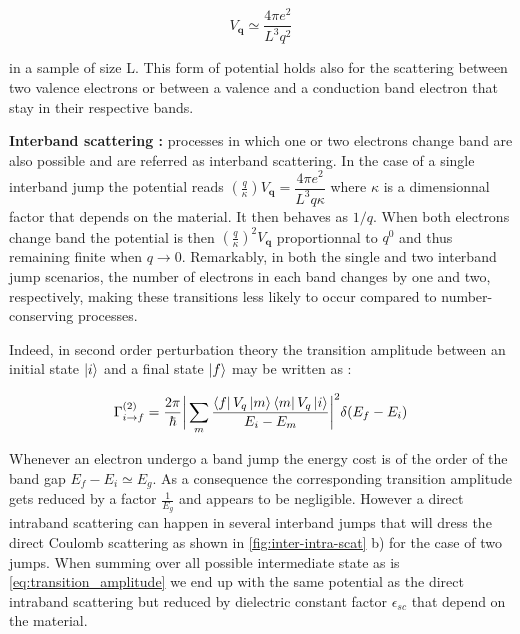 \begin{equation}
    V_{\textbf{q}} \simeq \dfrac{4\pi e^2}{L^3 q^2}
\end{equation}
 
\noindent in a sample of size L. This form of potential holds also for the scattering between two valence electrons or between a valence and a conduction band electron that stay in their respective bands.

\bigskip

\textbf{Interband scattering :}
processes in which one or two electrons change band are also possible and are referred as interband scattering. In the case of a single 
interband jump the potential reads $(\frac{q}{\kappa})V_{\textbf{q}}= \dfrac{4\pi e^2}{L^3 q \kappa}$ where $\kappa$ is a dimensionnal factor that depends on the material. It then behaves as $1/q$. When both electrons change band the potential is then $(\frac{q}{\kappa})^2V_{\textbf{q}}$ proportionnal to $q^0$
and thus remaining finite when $q\to 0$. Remarkably, in both the single and two interband jump scenarios, the number of electrons in each band changes by one and two, respectively, making these transitions less likely to occur compared to number-conserving processes.

\bigskip
Indeed, in second order perturbation theory the transition amplitude between an initial state $\ket{i}$ and a final state $\ket{f}$ may be written as :

\begin{equation}
    \Gamma_{i\to f}^{(2)} = \dfrac{2\pi}{\hbar} \bigg \vert \sum_{m} \dfrac{\bra{f}V_q\ket{m}\bra{m}V_q\ket{i}}{E_i - E_m}\bigg \vert^2 \delta(E_f - E_i)
    \label{eq:transition_amplitude}
\end{equation}

\noindent Whenever an electron undergo a band jump the energy cost is of the order of the band gap $E_f - E_i \simeq E_g$. As a consequence the corresponding transition amplitude gets reduced by a factor $\frac{1}{E_g}$ and appears to be negligible.
 However a direct intraband scattering can happen in several interband jumps that will dress the direct Coulomb scattering as shown in \autoref{fig:inter-intra-scat} b) for the case of two jumps. When summing over all possible intermediate state as is \eqref{eq:transition_amplitude} we end up with the same potential as the direct intraband scattering but reduced by dielectric constant factor $\epsilon_{sc}$ that depend on the material.

 
\bigskip





